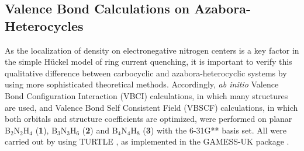 \subsection{Valence Bond Calculations on Azabora-Heterocycles}
As the localization of density on electronegative nitrogen centers is a key factor in the simple H\"uckel model of ring current
quenching, it is important to verify this qualitative difference between carbocyclic and azabora-heterocyclic systems
by using more sophisticated theoretical methods. Accordingly, \textit{ab initio} Valence Bond Configuration Interaction (VBCI)
calculations, in which many structures are used, and Valence Bond Self Consistent Field (VBSCF) \cite{r33} calculations, in
which both orbitals and structure coefficients are optimized, were performed on planar B$_2$N$_2$H$_4$ (\textbf{1}), B$_3$N$_3$H$_6$ (\textbf{2}) and
B$_4$N$_4$H$_8$ (\textbf{3}) with the 6-31G** basis set. All were carried out by using TURTLE \cite{r34}, as implemented in the GAMESS-UK
package \cite{r35}.

